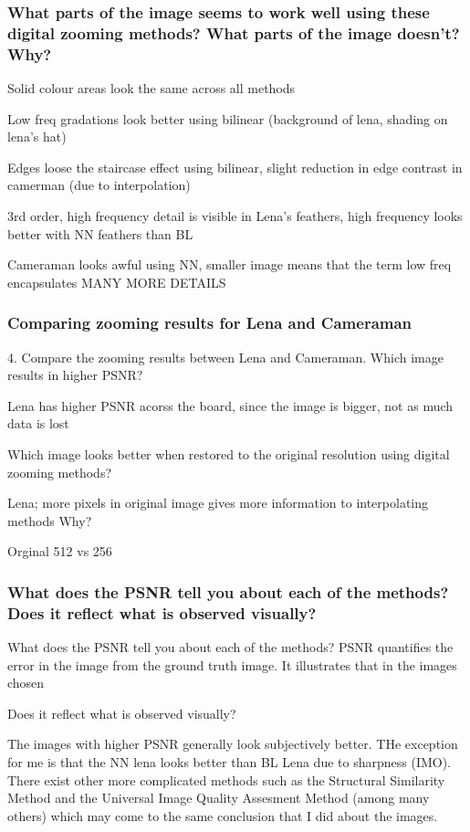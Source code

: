 \documentclass[article, 1.5space, letterpaper, 12pt, oneside, header, footer]{SydeClass}
\begin{document}
\subsubsection{What parts of the image seems to work well using these digital zooming methods? What parts of the
image doesn't? Why?}

Solid colour areas look the same across all methods

Low freq gradations look better using bilinear (background of lena, shading on lena's hat)

Edges loose the staircase effect using bilinear, slight reduction in edge contrast in camerman (due to interpolation)

3rd order, high frequency detail is visible in Lena's feathers, high frequency looks better with NN feathers than BL

Cameraman looks awful using NN, smaller image means that the term low freq encapsulates  MANY MORE DETAILS

\subsubsection{Comparing zooming results for Lena and Cameraman}
4. Compare the zooming results between Lena and Cameraman. Which image results in higher PSNR?

Lena has higher PSNR acorss the board, since the image is bigger, not as much data is lost 

Which image looks better when restored to the original resolution using digital zooming methods?

Lena; more pixels in original image gives more information to interpolating methods
Why?

Orginal 512 vs 256

\subsubsection{What does the PSNR tell you about each of the methods? Does it reflect what is observed visually?}

What does the PSNR tell you about each of the methods?
PSNR quantifies the error in the image from the ground truth image. It illustrates that in the images chosen 

Does it reflect what is observed visually?

The images with higher PSNR generally look subjectively better. THe exception for me is that the NN lena looks better than BL Lena due to sharpness (IMO). There exist other more complicated methods such as the Structural Similarity Method \cite{ssim-image-qual} and the Universal Image Quality Assesment Method \cite{universal-image-qual} (among many others) which may come to the same conclusion that I did about the images.
\end{document}
